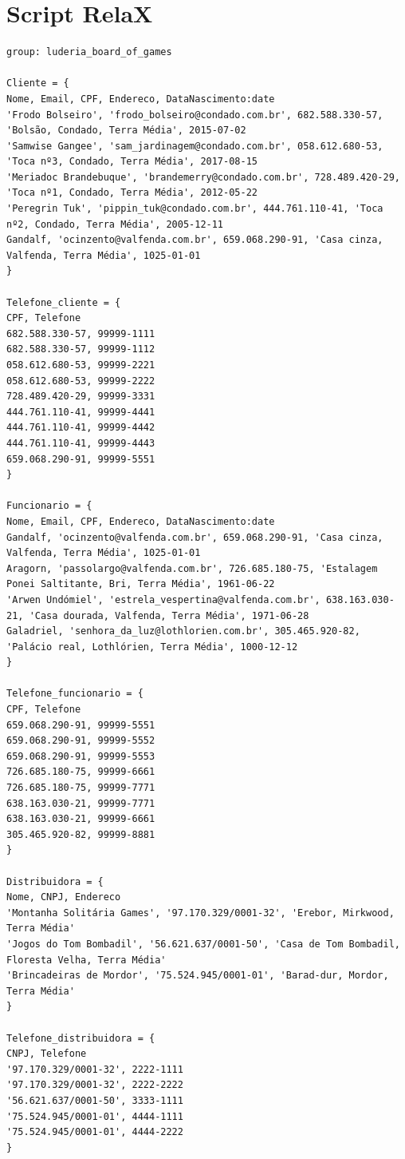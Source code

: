 \documentclass[11pt]{article}
\begin{document}
\section{Script RelaX}
\begin{Verbatim}[breaklines=true, breakanywhere=true]
group: luderia_board_of_games

Cliente = {
Nome, Email, CPF, Endereco, DataNascimento:date
'Frodo Bolseiro', 'frodo_bolseiro@condado.com.br', 682.588.330-57, 'Bolsão, Condado, Terra Média', 2015-07-02
'Samwise Gangee', 'sam_jardinagem@condado.com.br', 058.612.680-53, 'Toca nº3, Condado, Terra Média', 2017-08-15
'Meriadoc Brandebuque', 'brandemerry@condado.com.br', 728.489.420-29, 'Toca nº1, Condado, Terra Média', 2012-05-22
'Peregrin Tuk', 'pippin_tuk@condado.com.br', 444.761.110-41, 'Toca nº2, Condado, Terra Média', 2005-12-11
Gandalf, 'ocinzento@valfenda.com.br', 659.068.290-91, 'Casa cinza, Valfenda, Terra Média', 1025-01-01
}

Telefone_cliente = {
CPF, Telefone
682.588.330-57, 99999-1111
682.588.330-57, 99999-1112
058.612.680-53, 99999-2221
058.612.680-53, 99999-2222
728.489.420-29, 99999-3331
444.761.110-41, 99999-4441
444.761.110-41, 99999-4442
444.761.110-41, 99999-4443
659.068.290-91, 99999-5551
}

Funcionario = {
Nome, Email, CPF, Endereco, DataNascimento:date
Gandalf, 'ocinzento@valfenda.com.br', 659.068.290-91, 'Casa cinza, Valfenda, Terra Média', 1025-01-01
Aragorn, 'passolargo@valfenda.com.br', 726.685.180-75, 'Estalagem Ponei Saltitante, Bri, Terra Média', 1961-06-22
'Arwen Undómiel', 'estrela_vespertina@valfenda.com.br', 638.163.030-21, 'Casa dourada, Valfenda, Terra Média', 1971-06-28
Galadriel, 'senhora_da_luz@lothlorien.com.br', 305.465.920-82, 'Palácio real, Lothlórien, Terra Média', 1000-12-12
}

Telefone_funcionario = {
CPF, Telefone
659.068.290-91, 99999-5551
659.068.290-91, 99999-5552
659.068.290-91, 99999-5553
726.685.180-75, 99999-6661
726.685.180-75, 99999-7771
638.163.030-21, 99999-7771
638.163.030-21, 99999-6661
305.465.920-82, 99999-8881
}

Distribuidora = {
Nome, CNPJ, Endereco
'Montanha Solitária Games', '97.170.329/0001-32', 'Erebor, Mirkwood, Terra Média'
'Jogos do Tom Bombadil', '56.621.637/0001-50', 'Casa de Tom Bombadil, Floresta Velha, Terra Média'
'Brincadeiras de Mordor', '75.524.945/0001-01', 'Barad-dur, Mordor, Terra Média'
}

Telefone_distribuidora = {
CNPJ, Telefone
'97.170.329/0001-32', 2222-1111
'97.170.329/0001-32', 2222-2222
'56.621.637/0001-50', 3333-1111
'75.524.945/0001-01', 4444-1111
'75.524.945/0001-01', 4444-2222
}


\end{Verbatim}
\end{document}
